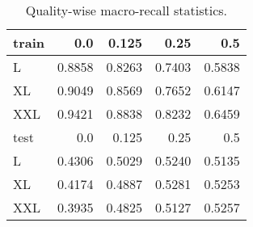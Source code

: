 \begin{table}[h]
\begin{center}
\caption{Quality-wise macro-recall statistics.}
\label{tab:qwise_macro_recall}
\begin{tabular}{l|rrrr}
\hline
 train   &    0.0 &   0.125 &   0.25 &    0.5 \\
\hline
 L       & 0.8858 &  0.8263 & 0.7403 & 0.5838 \\
 XL      & 0.9049 &  0.8569 & 0.7652 & 0.6147 \\
 XXL     & 0.9421 &  0.8838 & 0.8232 & 0.6459 \\
\hline
 test   &    0.0 &   0.125 &   0.25 &    0.5 \\
\hline
 L      & 0.4306 &  0.5029 & 0.5240 & 0.5135 \\
 XL     & 0.4174 &  0.4887 & 0.5281 & 0.5253 \\
 XXL    & 0.3935 &  0.4825 & 0.5127 & 0.5257 \\
\hline
\end{tabular}
\end{center}
\end{table}

